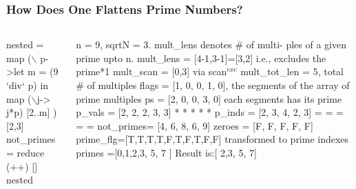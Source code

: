 \documentclass{beamer}
\renewcommand{\emph}[1]{\textcolor{structure}{#1}}
\newcommand{\emp}[1]{\textcolor{DikuRed}{ #1}}
\newcommand{\mymath}[1]{$ #1 $}
\newcommand{\myindu}[1]{^{#1}}
\begin{document}
\begin{frame}[fragile,t]
  \frametitle{How Does One Flattens Prime Numbers?}

\begin{columns}
\begin{colorcode}[fontsize=\scriptsize]
nested = \emp{map} (\mymath{\backslash}\emp{p}->let m = (9 `div` p) 
                  in  \emp{map} (\mymath{\backslash}j-> j*p)
                          [2..m]
             ) \emp{[2,3]}
not_primes  = \emph{reduce} (++) [] nested
\end{colorcode}
\begin{colorcode}[fontsize=\scriptsize]
n = 9, sqrtN = 3.
mult_lens denotes \# of multi-
  ples of a given prime upto n.
mult_lens = [4-1,3-1]=[3,2] i.e., 
            excludes the prime*1
mult_scan = [0,3] via scan\mymath{\myindu{exc}} 
mult_tot_len = 5, total \# of multiples 
flags     = [1, 0, 0, 1, 0],
  the segments of the array
        of prime multiples
ps        = [2, 0, 0, 3, 0]
  each segments has its prime
p_vals    = [2, 2, 2, 3, 3]
             *  *  *  *  *
p_inds    = [2, 3, 4, 2, 3]
             =  =  =  =  =
not_primes= [4, 6, 8, 6, 9]
zeroes    = [F, F, F, F, F]
prime_flg=[T,T,T,T,F,T,F,T,F,F]
  transformed to prime indexes
primes   =[0,1,2,3,  5,  7    ]
\alert{Result is:[    2,3,  5,  7]}
\end{colorcode}
\end{columns}

\end{frame}
\end{document}
